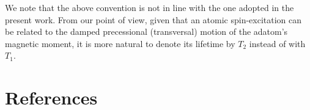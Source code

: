 \documentclass[prb,footinbib,showpacs,twocolumn,amsmath,amssymb]{revtex4}
\begin{document}
We note that the above convention is not in line with the one 
adopted in the present work.
From our point of view, given that an atomic spin-excitation can be related to  
the damped precessional (transversal) motion of the adatom's magnetic moment, 
it is more natural to denote its lifetime by $T_{2}$ 
instead of with  $T_{1}$.



\section*{References}

\end{document}
